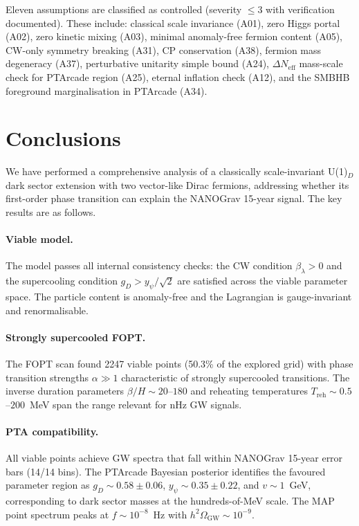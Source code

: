 \documentclass[12pt,a4paper]{article}
\begin{document}
Eleven assumptions are classified as controlled (severity $\le 3$ with verification documented). These include: classical scale invariance (A01), zero Higgs portal (A02), zero kinetic mixing (A03), minimal anomaly-free fermion content (A05), CW-only symmetry breaking (A31), CP conservation (A38), fermion mass degeneracy (A37), perturbative unitarity simple bound (A24), $\Delta N_{\text{eff}}$ mass-scale check for PTArcade region (A25), eternal inflation check (A12), and the SMBHB foreground marginalisation in PTArcade (A34).

\section{Conclusions}
\label{sec:conclusions}

We have performed a comprehensive analysis of a classically scale-invariant U(1)$_D$ dark sector extension with two vector-like Dirac fermions, addressing whether its first-order phase transition can explain the NANOGrav 15-year signal. The key results are as follows.

\paragraph{Viable model.}
The model passes all internal consistency checks: the CW condition $\beta_\lambda > 0$ and the supercooling condition $g_D > y_\psi/\sqrt{2}$ are satisfied across the viable parameter space. The particle content is anomaly-free and the Lagrangian is gauge-invariant and renormalisable.

\paragraph{Strongly supercooled FOPT.}
The FOPT scan found 2247 viable points (50.3\% of the explored grid) with phase transition strengths $\alpha \gg 1$ characteristic of strongly supercooled transitions. The inverse duration parameters $\beta/H \sim 20$--$180$ and reheating temperatures $T_\text{reh} \sim 0.5$--$200$~MeV span the range relevant for nHz GW signals.

\paragraph{PTA compatibility.}
All viable points achieve GW spectra that fall within NANOGrav 15-year error bars (14/14 bins). The PTArcade Bayesian posterior identifies the favoured parameter region as $g_D \sim 0.58 \pm 0.06$, $y_\psi \sim 0.35 \pm 0.22$, and $v \sim 1$~GeV, corresponding to dark sector masses at the hundreds-of-MeV scale. The MAP point spectrum peaks at $f \sim 10^{-8}$~Hz with $h^2\Omega_\text{GW} \sim 10^{-9}$.
\end{document}
